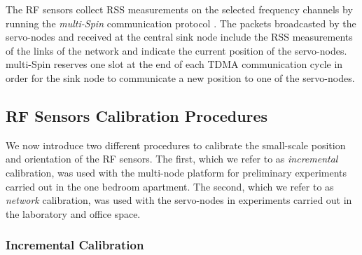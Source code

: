 \documentclass[conference]{IEEEtran}
\begin{document}
The RF sensors collect RSS measurements on the selected frequency channels by running the \emph{multi-Spin} communication protocol \cite{EvAAL_book}. The packets broadcasted by the servo-nodes and received at the central sink node include the RSS measurements of the links of the network and indicate the current position of the servo-nodes. multi-Spin reserves one slot at the end of each TDMA communication cycle in order for the sink node to communicate a new position to one of the servo-nodes.



\subsection{RF Sensors Calibration Procedures}
\label{sec:calibration_procedures}

We now introduce two different procedures to calibrate the small-scale position and orientation of the RF sensors. The first, which we refer to as \emph{incremental} calibration, was used with the multi-node platform for preliminary experiments carried out in the one bedroom apartment. The second, which we refer to as \emph{network} calibration, was used with the servo-nodes in experiments carried out in the laboratory and office space.

\subsubsection{Incremental Calibration}
\label{sec:incremental_calibration}
\end{document}
